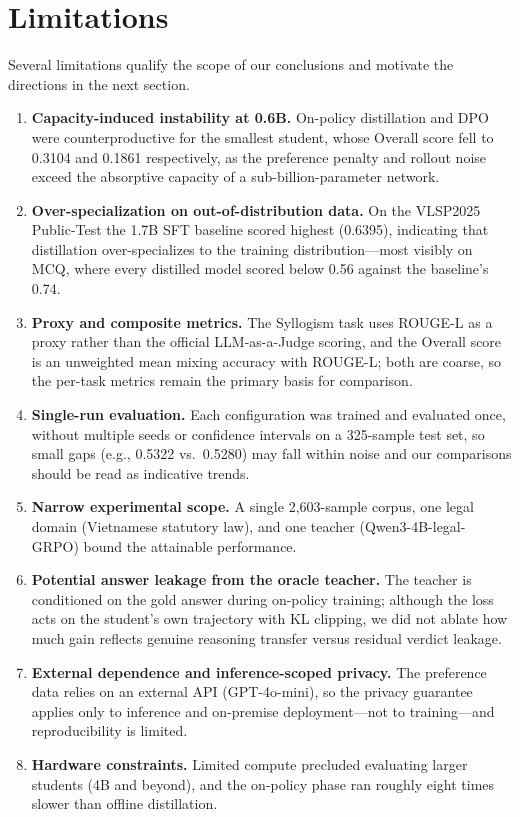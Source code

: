\section{Limitations}

Several limitations qualify the scope of our conclusions and motivate the directions in the next section.

\begin{enumerate}
    \item \textbf{Capacity-induced instability at 0.6B.} On-policy distillation and DPO were counterproductive for the smallest student, whose Overall score fell to 0.3104 and 0.1861 respectively, as the preference penalty and rollout noise exceed the absorptive capacity of a sub-billion-parameter network.
    \item \textbf{Over-specialization on out-of-distribution data.} On the VLSP2025 Public-Test the 1.7B SFT baseline scored highest (0.6395), indicating that distillation over-specializes to the training distribution---most visibly on MCQ, where every distilled model scored below 0.56 against the baseline's 0.74.
    \item \textbf{Proxy and composite metrics.} The Syllogism task uses ROUGE-L as a proxy rather than the official LLM-as-a-Judge scoring, and the Overall score is an unweighted mean mixing accuracy with ROUGE-L; both are coarse, so the per-task metrics remain the primary basis for comparison.
    \item \textbf{Single-run evaluation.} Each configuration was trained and evaluated once, without multiple seeds or confidence intervals on a 325-sample test set, so small gaps (e.g., 0.5322 vs.\ 0.5280) may fall within noise and our comparisons should be read as indicative trends.
    \item \textbf{Narrow experimental scope.} A single 2,603-sample corpus, one legal domain (Vietnamese statutory law), and one teacher (Qwen3-4B-legal-GRPO) bound the attainable performance.
    \item \textbf{Potential answer leakage from the oracle teacher.} The teacher is conditioned on the gold answer during on-policy training; although the loss acts on the student's own trajectory with KL clipping, we did not ablate how much gain reflects genuine reasoning transfer versus residual verdict leakage.
    \item \textbf{External dependence and inference-scoped privacy.} The preference data relies on an external API (GPT-4o-mini), so the privacy guarantee applies only to inference and on-premise deployment---not to training---and reproducibility is limited.
    \item \textbf{Hardware constraints.} Limited compute precluded evaluating larger students (4B and beyond), and the on-policy phase ran roughly eight times slower than offline distillation.
\end{enumerate}
